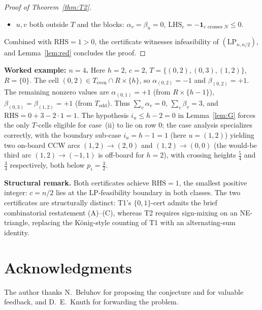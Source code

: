 \documentclass[11pt]{article}
\theoremstyle{plain}
\theoremstyle{remark}
\newcommand{\LHS}{\mathrm{LHS}}
\newcommand{\RHS}{\mathrm{RHS}}
\begin{document}
\begin{proof}[Proof of Theorem~\ref{thm:T2}]
\begin{itemize}
\item[(vi)] $u,v$ both outside $T$ and the blocks:
$\alpha_v=\beta_u=0$, $\LHS_e=-\mathbf{1}_{e\text{ crosses }N}\le 0$.
\end{itemize}
Combined with $\RHS=1>0$, the certificate witnesses infeasibility of
$(\mathrm{LP}_{n,n/2})$, and Lemma~\ref{lem:red} concludes the proof.
\end{proof}

\medskip\noindent\textbf{Worked example: $n=4$.}
Here $h=2$, $c=2$, $T=\{(0,2),(0,3),(1,2)\}$, $R=\{0\}$.  The cell
$(0,2)\in T_{\mathrm{even}}\cap R\times\{h\}$, so
$\alpha_{(0,2)}=-1$ and $\beta_{(0,2)}=+1$.  The remaining nonzero
values are $\alpha_{(0,1)}=+1$ (from $R\times\{h-1\}$),
$\beta_{(0,3)}=\beta_{(1,2)}=+1$ (from $T_{\mathrm{odd}}$).  Thus
$\sum_v\alpha_v=0$, $\sum_v\beta_v=3$, and $\RHS=0+3-2\cdot 1=1$.
The hypothesis $i_u\le h-2=0$ in Lemma~\ref{lem:G} forces the only
$T$-cells eligible for case~(ii) to lie on row $0$;  the case
analysis specializes correctly, with the boundary sub-case
$i_u=h-1=1$ (here $u=(1,2)$) yielding two on-board CCW arcs
$(1,2)\to(2,0)$ and $(1,2)\to(0,0)$ (the would-be third arc
$(1,2)\to(-1,1)$ is off-board for $h=2$), with crossing heights
$\tfrac54$ and $\tfrac34$ respectively, both below $p_i=\tfrac32$.

\medskip\noindent\textbf{Structural remark.}
Both certificates achieve $\RHS=1$, the smallest positive integer:
$c=n/2$ lies at the LP-feasibility boundary in both classes.  The
two certificates are structurally distinct: T1's $\{0,1\}$-cert
admits the brief combinatorial restatement (A)--(C), whereas T2
requires sign-mixing on an NE-triangle, replacing the König-style
counting of T1 with an alternating-sum identity.

\bigskip
\section*{Acknowledgments}

The author thanks N.~Beluhov for proposing the conjecture and for
valuable feedback, and D.~E.~Knuth for forwarding the problem.
\end{document}
